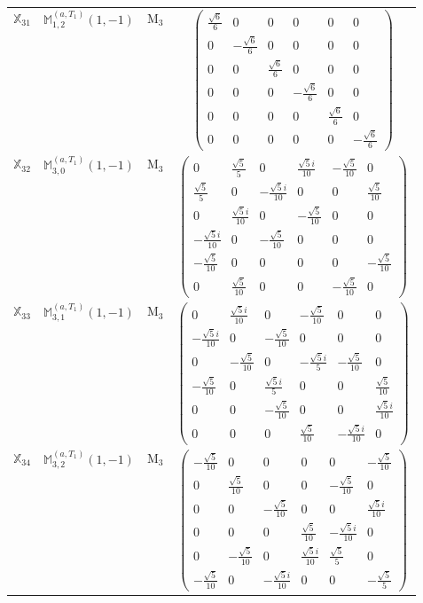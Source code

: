 \documentclass[fleqn,10pt,landscape]{article}
\begin{document}
\begin{itemize}
\begin{center}
\begin{longtable}{c|c|c|c}
$ \mathbb{X}_{31} $ & $\mathbb{M}_{1,2}^{(a,T_{1})}(1,-1)$ & M$_{3}$ & $\begin{pmatrix} \frac{\sqrt{6}}{6} & 0 & 0 & 0 & 0 & 0 \\ 0 & - \frac{\sqrt{6}}{6} & 0 & 0 & 0 & 0 \\ 0 & 0 & \frac{\sqrt{6}}{6} & 0 & 0 & 0 \\ 0 & 0 & 0 & - \frac{\sqrt{6}}{6} & 0 & 0 \\ 0 & 0 & 0 & 0 & \frac{\sqrt{6}}{6} & 0 \\ 0 & 0 & 0 & 0 & 0 & - \frac{\sqrt{6}}{6} \end{pmatrix}$ \\
$ \mathbb{X}_{32} $ & $\mathbb{M}_{3,0}^{(a,T_{1})}(1,-1)$ & M$_{3}$ & $\begin{pmatrix} 0 & \frac{\sqrt{5}}{5} & 0 & \frac{\sqrt{5} i}{10} & - \frac{\sqrt{5}}{10} & 0 \\ \frac{\sqrt{5}}{5} & 0 & - \frac{\sqrt{5} i}{10} & 0 & 0 & \frac{\sqrt{5}}{10} \\ 0 & \frac{\sqrt{5} i}{10} & 0 & - \frac{\sqrt{5}}{10} & 0 & 0 \\ - \frac{\sqrt{5} i}{10} & 0 & - \frac{\sqrt{5}}{10} & 0 & 0 & 0 \\ - \frac{\sqrt{5}}{10} & 0 & 0 & 0 & 0 & - \frac{\sqrt{5}}{10} \\ 0 & \frac{\sqrt{5}}{10} & 0 & 0 & - \frac{\sqrt{5}}{10} & 0 \end{pmatrix}$ \\
$ \mathbb{X}_{33} $ & $\mathbb{M}_{3,1}^{(a,T_{1})}(1,-1)$ & M$_{3}$ & $\begin{pmatrix} 0 & \frac{\sqrt{5} i}{10} & 0 & - \frac{\sqrt{5}}{10} & 0 & 0 \\ - \frac{\sqrt{5} i}{10} & 0 & - \frac{\sqrt{5}}{10} & 0 & 0 & 0 \\ 0 & - \frac{\sqrt{5}}{10} & 0 & - \frac{\sqrt{5} i}{5} & - \frac{\sqrt{5}}{10} & 0 \\ - \frac{\sqrt{5}}{10} & 0 & \frac{\sqrt{5} i}{5} & 0 & 0 & \frac{\sqrt{5}}{10} \\ 0 & 0 & - \frac{\sqrt{5}}{10} & 0 & 0 & \frac{\sqrt{5} i}{10} \\ 0 & 0 & 0 & \frac{\sqrt{5}}{10} & - \frac{\sqrt{5} i}{10} & 0 \end{pmatrix}$ \\
$ \mathbb{X}_{34} $ & $\mathbb{M}_{3,2}^{(a,T_{1})}(1,-1)$ & M$_{3}$ & $\begin{pmatrix} - \frac{\sqrt{5}}{10} & 0 & 0 & 0 & 0 & - \frac{\sqrt{5}}{10} \\ 0 & \frac{\sqrt{5}}{10} & 0 & 0 & - \frac{\sqrt{5}}{10} & 0 \\ 0 & 0 & - \frac{\sqrt{5}}{10} & 0 & 0 & \frac{\sqrt{5} i}{10} \\ 0 & 0 & 0 & \frac{\sqrt{5}}{10} & - \frac{\sqrt{5} i}{10} & 0 \\ 0 & - \frac{\sqrt{5}}{10} & 0 & \frac{\sqrt{5} i}{10} & \frac{\sqrt{5}}{5} & 0 \\ - \frac{\sqrt{5}}{10} & 0 & - \frac{\sqrt{5} i}{10} & 0 & 0 & - \frac{\sqrt{5}}{5} \end{pmatrix}$ \\

\end{longtable}
\end{center}
\end{itemize}
\end{document}
